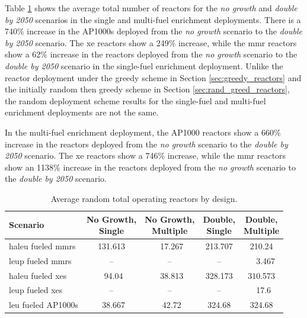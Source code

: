 Table \ref{tab:random_reac_avg} shows the average total number of reactors for the \textit{no growth} and \textit{double by 2050} scenarios in the single and multi-fuel enrichment deployments. There is a 740\% increase in the AP1000s deployed from the \textit{no growth} scenario to the \textit{double by 2050} scenario. The \gls{xe} reactors show a 249\% increase, while the \gls{mmr} reactors show a 62\% increase in the reactors deployed from the \textit{no growth} scenario to the \textit{double by 2050} scenario in the single-fuel enrichment deployment. Unlike the reactor deployment under the greedy scheme in Section \ref{sec:greedy_reactors} and the initially random then greedy scheme in Section \ref{sec:rand_greed_reactors}, the random deployment scheme results for the single-fuel and multi-fuel enrichment deployments are not the same.

In the multi-fuel enrichment deployment, the AP1000 reactors show a 660\% increase in the reactors deployed from the \textit{no growth} scenario to the \textit{double by 2050} scenario. The \gls{xe} reactors show a 746\% increase, while the \gls{mmr} reactors show an 1138\% increase in the reactors deployed from the \textit{no growth} scenario to the \textit{double by 2050} scenario.

\begin{table}[H]
    \centering
    \caption{Average random total operating reactors by design.}
    \label{tab:random_reac_avg}
    \begin{tabular}{l c c c c}
       \toprule
       Scenario & \shortstack{No Growth,\\ Single} & \shortstack{No Growth,\\ Multiple} & \shortstack{Double,\\ Single} & \shortstack{Double,\\ Multiple}  \\
       \midrule
       \gls{haleu} fueled \glspl{mmr} & 131.613 & \textcolor{white}{0}17.267  & 213.707 & 210.24  \\
       \gls{leup} fueled \glspl{mmr}  & --      & --      & --      & \textcolor{white}{00}3.467   \\
       \gls{haleu} fueled \glspl{xe}  & \textcolor{white}{0}94.04   & \textcolor{white}{0}38.813  & 328.173 & 310.573 \\
       \gls{leup} fueled \glspl{xe}   & --      & --      & --      & \textcolor{white}{0}17.6    \\
       \gls{leu} fueled AP1000s       & \textcolor{white}{0}38.667  & \textcolor{white}{0}42.72   & 324.68  & 324.68  \\
       \bottomrule
    \end{tabular}
\end{table}




